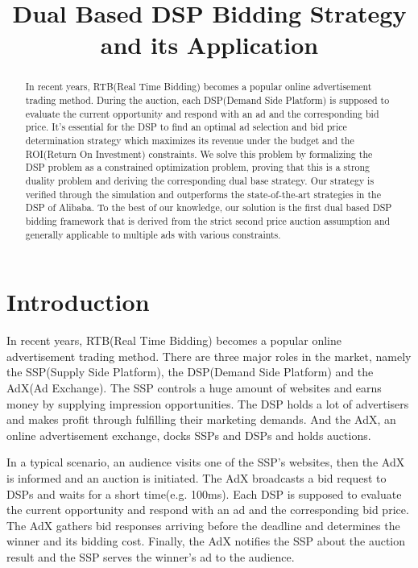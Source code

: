 \documentclass{article}
\title{Dual Based DSP Bidding Strategy and its Application}
\begin{document}
\maketitle

\begin{abstract}
In recent years, RTB(Real Time Bidding) becomes a popular online advertisement trading method.
During the auction, each DSP(Demand Side Platform) is supposed to
    evaluate the current opportunity and respond with an ad and the corresponding bid price.
It's essential for the DSP to find an optimal ad selection and bid price determination strategy
    which maximizes its revenue under the budget and the ROI(Return On Investment) constraints.
We solve this problem by
    formalizing the DSP problem as a constrained optimization problem,
    proving that this is a strong duality problem and deriving the corresponding dual base strategy.
Our strategy is verified through the simulation and outperforms the state-of-the-art strategies in the DSP of Alibaba.
To the best of our knowledge, our solution is the first dual based DSP bidding framework
    that is derived from the strict second price auction assumption and
    generally applicable to multiple ads with various constraints.
\end{abstract}


\section{Introduction} \label{Introduction}

In recent years, RTB(Real Time Bidding) becomes a popular online advertisement trading method.
There are three major roles in the market, namely the SSP(Supply Side Platform), the DSP(Demand Side Platform) and the AdX(Ad Exchange).
The SSP controls a huge amount of websites and earns money by supplying impression opportunities.
The DSP holds a lot of advertisers and makes profit through fulfilling their marketing demands.
And the AdX, an online advertisement exchange, docks SSPs and DSPs and holds auctions.

In a typical scenario, an audience visits one of the SSP's websites, then the AdX is informed and an auction is initiated.
The AdX broadcasts a bid request to DSPs and waits for a short time(e.g. 100ms).
Each DSP is supposed to evaluate the current opportunity and respond with an ad and the corresponding bid price.
The AdX gathers bid responses arriving before the deadline and determines the winner and its bidding cost.
Finally, the AdX notifies the SSP about the auction result and the SSP serves the winner's ad to the audience.
\end{document}
